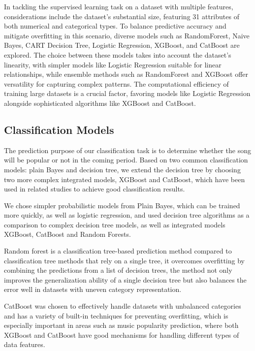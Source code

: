 \documentclass{article}
\begin{document}
In tackling the supervised learning task on a dataset with multiple features, considerations include the dataset's substantial size, featuring 31 attributes of both numerical and categorical types. To balance predictive accuracy and mitigate overfitting in this scenario, diverse models such as RandomForest, Naive Bayes, CART Decision Tree, Logistic Regression, XGBoost, and CatBoost are explored. The choice between these models takes into account the dataset's linearity, with simpler models like Logistic Regression suitable for linear relationships, while ensemble methods such as RandomForest and XGBoost offer versatility for capturing complex patterns. The computational efficiency of training large datasets is a crucial factor, favoring models like Logistic Regression alongside sophisticated algorithms like XGBoost and CatBoost.


\subsection{Classification Models}
The prediction purpose of our classification task is to determine whether the song will be popular or not in the coming period. Based on two common classification models: plain Bayes and decision tree, we extend the decision tree by choosing two more complex integrated models, XGBoost and CatBoost, which have been used in related studies to achieve good classification results\cite{appxgboost}.

We chose simpler probabilistic models from Plain Bayes, which can be trained more quickly, as well as logistic regression, and used decision tree algorithms as a comparison to complex decision tree models, as well as integrated models XGBoost, CatBoost and Random Forests\cite{rf}.

Random forest is a classification tree-based prediction method compared to classification tree methods that rely on a single tree, it overcomes overfitting by combining the predictions from a list of decision trees, the method not only improves the generalization ability of a single decision tree but also balances the error well in datasets with uneven category representation.

CatBoost was chosen to effectively handle datasets with unbalanced categories and has a variety of built-in techniques for preventing overfitting, which is especially important in areas such as music popularity prediction, where both XGBoost and CatBoost have good mechanisms for handling different types of data features\cite{xgboost}\cite{catboost}.
\end{document}
